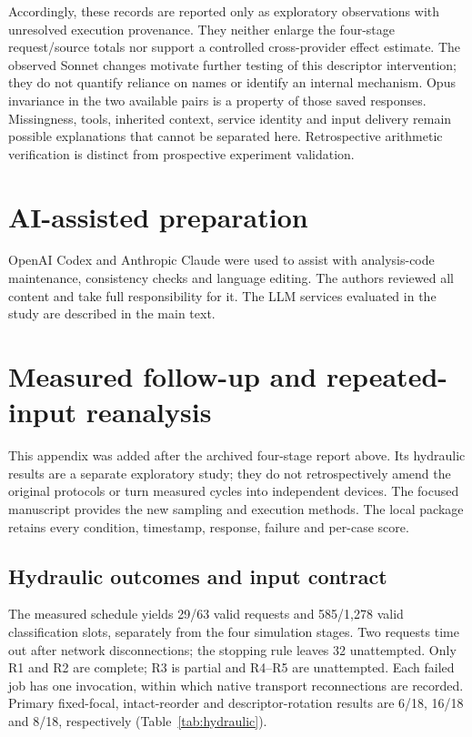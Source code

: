 \documentclass[11pt,a4paper]{article}
\begin{document}
Accordingly, these records are reported only as exploratory observations with unresolved execution provenance. They neither enlarge the four-stage request/source totals nor support a controlled cross-provider effect estimate. The observed Sonnet changes motivate further testing of this descriptor intervention; they do not quantify reliance on names or identify an internal mechanism. Opus invariance in the two available pairs is a property of those saved responses. Missingness, tools, inherited context, service identity and input delivery remain possible explanations that cannot be separated here. Retrospective arithmetic verification is distinct from prospective experiment validation.


\FloatBarrier
\section*{AI-assisted preparation}
OpenAI Codex and Anthropic Claude were used to assist with analysis-code maintenance, consistency checks and language editing. The authors reviewed all content and take full responsibility for it. The LLM services evaluated in the study are described in the main text.
\section{Measured follow-up and repeated-input reanalysis}
This appendix was added after the archived four-stage report above. Its hydraulic results are a separate exploratory study; they do not retrospectively amend the original protocols or turn measured cycles into independent devices. The focused manuscript provides the new sampling and execution methods. The local package retains every condition, timestamp, response, failure and per-case score.

\subsection{Hydraulic outcomes and input contract}
The measured schedule yields 29/63 valid requests and 585/1,278 valid classification slots, separately from the four simulation stages. Two requests time out after network disconnections; the stopping rule leaves 32 unattempted. Only R1 and R2 are complete; R3 is partial and R4--R5 are unattempted. Each failed job has one invocation, within which native transport reconnections are recorded. Primary fixed-focal, intact-reorder and descriptor-rotation results are 6/18, 16/18 and 8/18, respectively (Table~\ref{tab:hydraulic}). 
\end{document}
